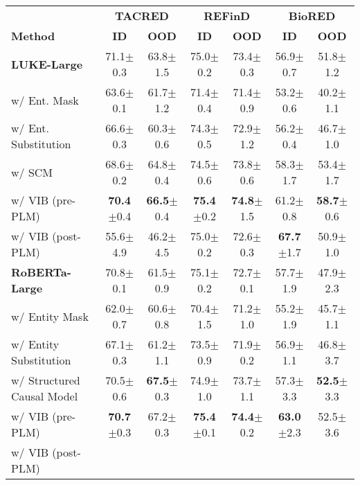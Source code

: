 \documentclass[11pt]{article}
\begin{document}
\begin{table*}[t]
\centering

\begin{tabular}{lcccccc}
\toprule
&  \multicolumn{2}{c}{\textbf{TACRED}} & \multicolumn{2}{c}{\textbf{REFinD}} & \multicolumn{2}{c}{\textbf{BioRED}} \\
\textbf{Method}  & \bf  ID &\bf OOD &\bf ID &\bf OOD &\bf ID &\bf OOD \\
\midrule

\textbf{LUKE-Large}  & 71.1{\tiny$\pm$0.3} & 63.8{\tiny$\pm$1.5} & 75.0{\tiny$\pm$0.2} & 73.4{\tiny$\pm$0.3} & 56.9{\tiny$\pm$0.7} & 51.8{\tiny$\pm$1.2} \\
\quad w/ Ent. Mask  & 63.6{\tiny$\pm$0.1} & 61.7{\tiny$\pm$1.2} & 71.4{\tiny$\pm$0.4} & 71.4{\tiny$\pm$0.9} & 53.2{\tiny$\pm$0.6} & 40.2{\tiny$\pm$1.1} \\
\quad w/ Ent. Substitution  & 66.6{\tiny$\pm$0.3} & 60.3{\tiny$\pm$0.6} & 74.3{\tiny$\pm$0.5} & 72.9{\tiny$\pm$1.2} & 56.2{\tiny$\pm$0.4} & 46.7{\tiny$\pm$1.0} \\
\quad w/ SCM  & 68.6{\tiny$\pm$0.2} & 64.8{\tiny$\pm$0.4} & 74.5{\tiny$\pm$0.6} & 73.8{\tiny$\pm$0.6} & 58.3{\tiny$\pm$1.7} & 53.4{\tiny$\pm$1.7} \\ \midrule
\quad w/ VIB (pre-PLM)   & \textbf{70.4}{\tiny$\pm$0.4} & \textbf{66.5}{\tiny$\pm$0.4} & \textbf{75.4}{\tiny$\pm$0.2} & \textbf{74.8}{\tiny$\pm$1.5} & {61.2}{\tiny$\pm$0.8} & \textbf{58.7}{\tiny$\pm$0.6} \\
\quad w/ VIB (post-PLM) &55.6{\tiny$\pm$4.9}&46.2{\tiny$\pm$4.5}&75.0{\tiny $\pm$0.2}&72.6{\tiny $\pm$0.3}&\textbf{67.7}{\tiny $\pm$1.7}&50.9{\tiny $\pm$1.0} \\
\midrule

\textbf{RoBERTa-Large}  & 70.8{\tiny$\pm$0.1} & 61.5{\tiny$\pm$0.9} & 75.1{\tiny$\pm$0.2} & 72.7{\tiny$\pm$0.1} & 57.7{\tiny$\pm$1.9} & 47.9{\tiny$\pm$2.3} \\
\quad w/ Entity Mask & 62.0{\tiny$\pm$0.7} & 60.6{\tiny$\pm$0.8} & 70.4{\tiny$\pm$1.5} & 71.2{\tiny$\pm$1.0} & 55.2{\tiny$\pm$1.9} & 45.7{\tiny$\pm$1.1} \\
\quad w/ Entity Substitution  & 67.1{\tiny$\pm$0.3} & 61.2{\tiny$\pm$1.1} & 73.5{\tiny$\pm$0.9} & 71.9{\tiny$\pm$0.2} & 56.9{\tiny$\pm$1.1} & 46.8{\tiny$\pm$3.7} \\
\quad w/ Structured Causal Model & 70.5{\tiny$\pm$0.6} & \textbf{67.5}{\tiny$\pm$0.3} & 74.9{\tiny$\pm$1.0} & 73.7{\tiny$\pm$1.1} & 57.3{\tiny$\pm$3.3} & \textbf{52.5}{\tiny$\pm$3.3} \\ \midrule
\quad w/ VIB (pre-PLM)  & \textbf{70.7}{\tiny$\pm$0.3} & 67.2{\tiny$\pm$0.3} & \textbf{75.4}{\tiny$\pm$0.1} & \textbf{74.4}{\tiny$\pm$0.2} & \textbf{63.0}{\tiny$\pm$2.3} & 52.5{\tiny$\pm$3.6} \\
\quad w/ VIB (post-PLM) &&&&&& \\


\end{tabular}
\end{table*}
\end{document}
